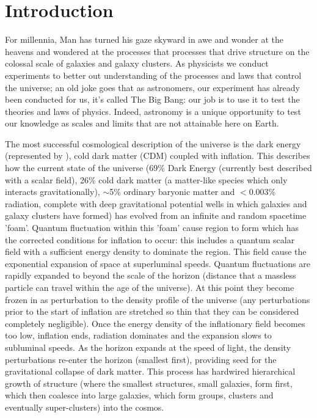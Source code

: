 \chapter{Introduction}
For millennia, Man has turned his gaze skyward in awe and wonder at the heavens and wondered at the processes that processes that drive structure on the colossal scale of galaxies and galaxy clusters. As physicists we conduct experiments to better out understanding of the processes and laws that control the universe; an old joke goes that as astronomers, our experiment has already been conducted for us, it's called The Big Bang: our job is to use it to test the theories and laws of physics. Indeed, astronomy is a unique opportunity to test our knowledge as scales and limits that are not attainable here on Earth.

The most successful cosmological description of the universe is the dark energy (represented by \textLambda), cold dark matter ({\textLambda}CDM) coupled with inflation. This describes how the current state of the universe (69\% Dark Energy (currently best described with a scalar field), 26\% cold dark matter (a matter-like species which only interacts gravitationally), $\sim$5\% ordinary baryonic matter and $<$0.003\% radiation, complete with deep gravitational potential wells in which galaxies and galaxy clusters have formed) has evolved from an infinite and random spacetime 'foam'. Quantum fluctuation within this 'foam' cause region to form which has the corrected conditions for inflation to occur: this includes a quantum scalar field with a sufficient energy density to dominate the region. This field cause the exponential expansion of space at superluminal speeds. Quantum fluctuations are rapidly expanded to beyond the scale of the horizon (distance that a massless particle can travel within the age of the universe). At this point they become frozen in as perturbation to the density profile of the universe (any perturbations prior to the start of inflation are stretched so thin that they can be considered completely negligible). Once the energy density of the inflationary field becomes too low, inflation ends, radiation dominates and the expansion slows to subluminal speeds. As the horizon expands at the speed of light, the density perturbations re-enter the horizon (smallest first), providing seed for the gravitational collapse of dark matter. This process has hardwired hierarchical growth of structure (where the smallest structures, small galaxies, form first, which then coalesce into large galaxies, which form groups, clusters and eventually super-clusters) into the cosmos. 

